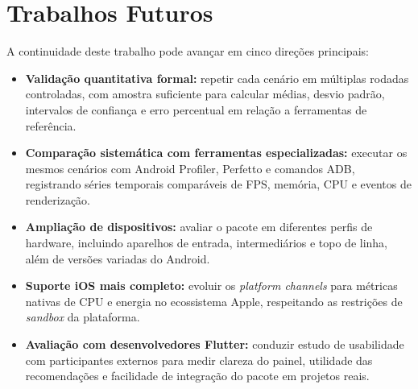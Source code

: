 \section{Trabalhos Futuros}

A continuidade deste trabalho pode avançar em cinco direções principais:

\begin{itemize}
  \item \textbf{Validação quantitativa formal:} repetir cada cenário em múltiplas rodadas controladas, com amostra suficiente para calcular médias, desvio padrão, intervalos de confiança e erro percentual em relação a ferramentas de referência.

  \item \textbf{Comparação sistemática com ferramentas especializadas:} executar os mesmos cenários com Android Profiler, Perfetto e comandos ADB, registrando séries temporais comparáveis de FPS, memória, CPU e eventos de renderização.

  \item \textbf{Ampliação de dispositivos:} avaliar o pacote em diferentes perfis de hardware, incluindo aparelhos de entrada, intermediários e topo de linha, além de versões variadas do Android.

  \item \textbf{Suporte iOS mais completo:} evoluir os \textit{platform channels} para métricas nativas de CPU e energia no ecossistema Apple, respeitando as restrições de \textit{sandbox} da plataforma.

  \item \textbf{Avaliação com desenvolvedores Flutter:} conduzir estudo de usabilidade com participantes externos para medir clareza do painel, utilidade das recomendações e facilidade de integração do pacote em projetos reais.
\end{itemize}

\clearpage
